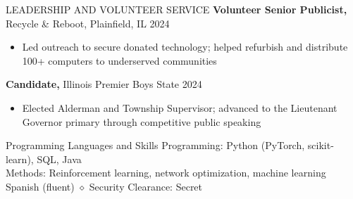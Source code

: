 \documentclass{resume}
\begin{document}
\begin{rSection}{LEADERSHIP AND VOLUNTEER SERVICE}
{\textbf{Volunteer Senior Publicist,} Recycle \& Reboot, Plainfield, IL} \hfill {2024}
\vspace{-5pt}
\begin{itemize}
\setlength\itemsep{-1.5ex}
    \item Led outreach to secure donated technology; helped refurbish and distribute 100+ computers to underserved communities
\end{itemize}

{\textbf{Candidate,} Illinois Premier Boys State} \hfill {2024}
\vspace{-5pt}
\begin{itemize}
\setlength\itemsep{-1.5ex}
    \item Elected Alderman and Township Supervisor; advanced to the Lieutenant Governor primary through competitive public speaking
\end{itemize}
\end{rSection}

\begin{rSection}{Programming Languages and Skills}
    Programming: Python (PyTorch, scikit-learn), SQL, Java \\
    Methods: Reinforcement learning, network optimization, machine learning \\
    Spanish (fluent) $\diamond$ Security Clearance: Secret
\end{rSection}
\end{document}
